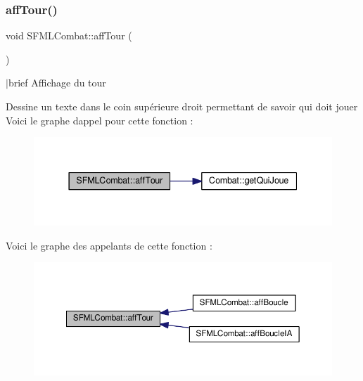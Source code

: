 \subsubsection{\texorpdfstring{aff\+Tour()}{affTour()}}
{\footnotesize\ttfamily void S\+F\+M\+L\+Combat\+::aff\+Tour (\begin{DoxyParamCaption}{ }\end{DoxyParamCaption})\hspace{0.3cm}{\ttfamily [private]}}

$\vert$brief Affichage du tour

Dessine un texte dans le coin supérieure droit permettant de savoir qui doit jouer Voici le graphe d\textquotesingle{}appel pour cette fonction \+:\nopagebreak
\begin{figure}[H]
\begin{center}
\leavevmode
\includegraphics[width=337pt]{class_s_f_m_l_combat_ae641a09e3a5a8e50b3fe8352207e4748_cgraph}
\end{center}
\end{figure}
Voici le graphe des appelants de cette fonction \+:\nopagebreak
\begin{figure}[H]
\begin{center}
\leavevmode
\includegraphics[width=350pt]{class_s_f_m_l_combat_ae641a09e3a5a8e50b3fe8352207e4748_icgraph}
\end{center}
\end{figure}
\mbox{\label{class_s_f_m_l_combat_a226dd0d639049753aef1fef95cf9a3f0}} 
